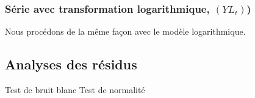 \documentclass[12pt,a4paper]{book}
\newcommand{\1}{\mathds{1}}
\begin{document}
\vspace{5 mm}
\subsubsection{Série avec transformation logarithmique, $(YL_t)$)}

Nous procédons de la même façon avec le modèle logarithmique. 


\vspace{5 mm}
\subsection{Analyses des résidus}
Test de bruit blanc
Test de normalité
\end{document}
